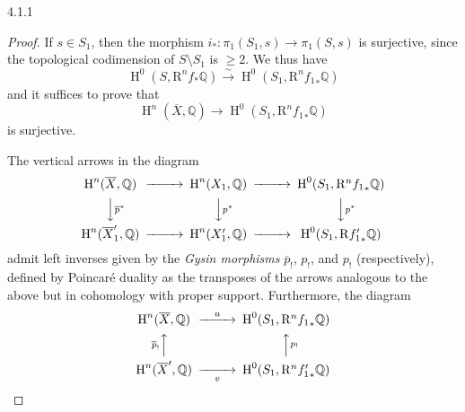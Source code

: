 \begin{theorem}{4.1.1}
\begin{proof}
      
  \par{}If \(s\in  S_1\), then the morphism \(i_*\colon \pi _1(S_1,s)\to \pi _1(S,s)\) is surjective, since the topological codimension of \(S\setminus  S_1\) is \(\geqslant 2\).
      We thus have
      \[         \operatorname {H}^0(S,\mathrm {R}^n f_*\mathbb {Q})         \xrightarrow {\sim } \operatorname {H}^0(S_1,\mathrm {R}^n {f_1}_*\mathbb {Q})       \]
      and it suffices to prove that
      \[         \operatorname {H}^n(\overline {X},\mathbb {Q})         \to  \operatorname {H}^0(S_1,\mathrm {R}^n {f_1}_*\mathbb {Q})       \]
      is surjective.\par{}The vertical arrows in the diagram
      \[         \begin {CD}           \operatorname {H}^n(\overline {X},\mathbb {Q}) @>>> \operatorname {H}^n(X_1,\mathbb {Q}) @>>> \operatorname {H}^0(S_1,\mathrm {R}^n{f_1}_*\mathbb {Q})         \\@VV{\overline {p}^*}V @VV{p^*}V @VV{p^*}V         \\\operatorname {H}^n(\overline {X}'_1,\mathbb {Q}) @>>> \operatorname {H}^n(X'_1,\mathbb {Q}) @>>> \operatorname {H}^0(S_1,\mathrm {R}{f'_1}_*\mathbb {Q})         \end {CD}       \]
      admit left inverses given by the \emph{Gysin morphisms} \(\overline {p}_!\), \(p_!\), and \(p_!\) (respectively), defined by Poincaré duality as the transposes of the arrows analogous to the above but in cohomology with proper support.
      Furthermore, the diagram
      \[         \begin {CD}           \operatorname {H}^n(\overline {X},\mathbb {Q}) @>{u}>> \operatorname {H}^0(S_1,\mathrm {R}^n{f_1}_*\mathbb {Q})         \\@A{\overline {p}_!}AA @AA{p_!}A         \\\operatorname {H}^n(\overline {X}',\mathbb {Q}) @>>{v}> \operatorname {H}^0(S_1,\mathrm {R}^n{f'_1}_*\mathbb {Q})         \end {CD}       \]

\end{proof}
\end{theorem}
